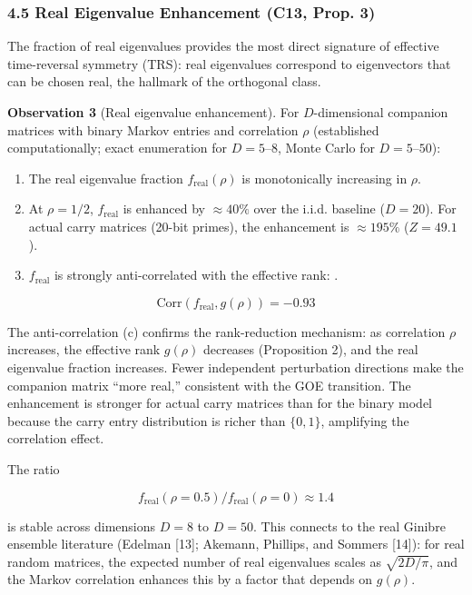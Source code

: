 \documentclass[
  11pt,
]{article}
\begin{document}
\subsubsection{4.5 Real Eigenvalue Enhancement (C13, Prop.
3)}\label{real-eigenvalue-enhancement-c13-prop.-3}

The fraction of real eigenvalues provides the most direct signature of effective
time-reversal symmetry (TRS): real eigenvalues correspond to eigenvectors that
can be chosen real, the hallmark of the orthogonal class.

\textbf{Observation 3} (Real eigenvalue enhancement). For \(D\)-dimensional
companion matrices with binary Markov entries and correlation \(\rho\)
(established computationally; exact enumeration for \(D = 5\)--\(8\), Monte
Carlo for \(D = 5\)--\(50\)):

\begin{enumerate}
\def\labelenumi{(\alph{enumi})}
\item
  The real eigenvalue fraction \(f_{\mathrm{real}}(\rho)\) is monotonically
  increasing in \(\rho\).
\item
  At \(\rho = 1/2\), \(f_{\mathrm{real}}\) is enhanced by \({\approx}40\%\) over
  the i.i.d. baseline (\(D = 20\)). For actual carry matrices (20-bit primes),
  the enhancement is \({\approx}195\%\) (\(Z = 49.1\)).
\item
  \(f_{\mathrm{real}}\) is strongly anti-correlated with the effective rank: .
\end{enumerate}

\[\mathrm{Corr}(f_{\mathrm{real}}, g(\rho)) = -0.93\]

The anti-correlation (c) confirms the rank-reduction mechanism: as correlation
\(\rho\) increases, the effective rank \(g(\rho)\) decreases (Proposition 2),
and the real eigenvalue fraction increases. Fewer independent perturbation
directions make the companion matrix ``more real,'' consistent with the GOE
transition. The enhancement is stronger for actual carry matrices than for the
binary model because the carry entry distribution is richer than
\(\lbrace{}0,1\rbrace{}\), amplifying the correlation effect.

The ratio

\[f_{\mathrm{real}}(\rho{=}0.5) / f_{\mathrm{real}}(\rho{=}0) \approx 1.4\]

is stable across dimensions \(D = 8\) to \(D = 50\). This connects to the real
Ginibre ensemble literature (Edelman {[}13{]}; Akemann, Phillips, and Sommers
{[}14{]}): for real random matrices, the expected number of real eigenvalues
scales as \(\sqrt{2D/\pi}\), and the Markov correlation enhances this by a
factor that depends on \(g(\rho)\).
\end{document}
